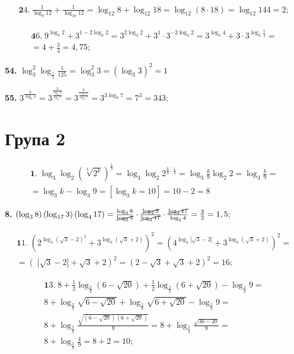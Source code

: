 \begin{multline*}
{\mathbf 24.}\;
\frac{1}{\log_8 12} + \frac{1}{\log_{18} 12} =
\log_{12} 8 + \log_{12} 18 =
\log_{12} (8 \cdot 18) =
\log_{12} 144 = 2;
\end{multline*}

\begin{multline*}
{\mathbf 46.}\;
9^{\log_3 2} + 3^{1 - 2\log_3 2} =
3^{2\log_3 2} + 3^1 \cdot 3^{-2\log_3 2} =
3^{\log_3 4} + 3 \cdot 3^{\log_3 \frac{1}{4}} =\\
= 4 + \frac{3}{4} = 4,75;
\end{multline*}

\textbf{54.} $\log^2_3 \log_{\frac{1}{5}} \frac{1}{125} = \log^2_3 3 = \left(\log_3 3\right)^2 = 1$

\textbf{55.} $3^{\frac{3}{\log_7 3}} = 3^{\frac{3}{\frac{\log_3 3}{\log_3 7}}} = 3^{\frac{3}{\frac{1}{\log_3 7}}} = 3^{3\log_3 7} = 7^3 = 343;$
\section*{Група 2}

\begin{multline*}
{\mathbf 1.}\;
\log_3\log_2 \left(\sqrt[3]{2^k}\right)^{\frac{1}{3}} =
\log_3 \log_2 2^{\frac{k}{3} \cdot \frac{1}{3}} =
\log_3 \frac{k}{9} \log_2 2 =
\log_3 \frac{k}{9} =\\
= \log_3 k - \log_3 9 = 
\left[\log_3 k = 10\right] = 
10 - 2 = 8
\end{multline*}

\textbf{8.} $\left(\log_3 8\right)\left(\log_{17} 3\right)\left(\log_4 17\right) = \frac{\log_2 8}{\cancel{\log_2 3}} \cdot \frac{\cancel{\log_2 3}}{\cancel{\log_2 17}} \cdot \frac{\cancel{\log_2 17}}{\log_2 4} = \frac{3}{2} = 1,5;$

\begin{multline*}
{\mathbf 11.}\;
\left(2^{\log_4 \left(\sqrt{3} - 2\right)^2} + 3^{\log_3 \left(\sqrt{3} + 2\right)}\right)^2 =
\left(4^{\log_4 \left|\sqrt{3} - 2\right|} + 3^{\log_3 \left(\sqrt{3} + 2\right)}\right)^2 =\\
= \left(\;\left|\sqrt{3} - 2\right| + \sqrt{3} + 2\right)^2 =
\left(2 - \sqrt{3} + \sqrt{3} + 2\right)^2 = 16;
\end{multline*}

\begin{multline*}
{\mathbf 13.}\;
8 + \frac{1}{2}\log_{\frac{2}{3}} \left(6 - \sqrt{20}\right) + \frac{1}{2}\log_{\frac{2}{3}} \left(6 + \sqrt{20}\right) - \log_{\frac{2}{3}} 9 =\\
8 + \log_{\frac{2}{3}} \sqrt{6 - \sqrt{20}} + \log_{\frac{2}{3}} \sqrt{6 + \sqrt{20}} - \log_{\frac{2}{3}} 9 =\\
8 + \log_{\frac{2}{3}} \frac{\sqrt{\left(6 - \sqrt{20}\right)\left(6 + \sqrt{20}\right)}}{9} =
8 + \log_{\frac{2}{3}} \frac{\sqrt{36 - 20}}{9} =\\
8 + \log_{\frac{2}{3}} \frac{4}{9} = 8 + 2 = 10;
\end{multline*}


